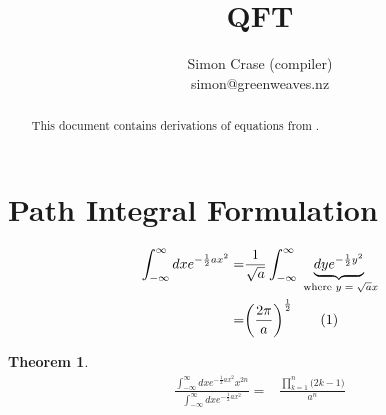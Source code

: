 \documentclass[]{article}
\title{QFT}
\author{Simon Crase (compiler)\\simon@greenweaves.nz}
\newcommand\numberthis{\addtocounter{equation}{1}\tag{\theequation}}
\newtheorem{thm}{Theorem}
\begin{document}
\maketitle

\begin{abstract}

This document contains derivations of equations from \cite{zee2010quantum}.

\end{abstract}

\section{Path Integral Formulation}

\begin{align*}
	\int_{-\infty}^{\infty} dx e^{-\frac{1}{2}ax^2} =& \frac{1}{\sqrt{a}}\int_{-\infty}^{\infty} \underbrace{dy e^{-\frac{1}{2}y^2}}_\text{ where $y=\sqrt{a}x$} \\
	=& \bigg(\frac{2\pi}{a}\bigg)^\frac{1}{2} \numberthis \label{eq:integral:gaussian}
\end{align*}
\begin{thm}
	\begin{align*}
		\frac{\int_{-\infty}^\infty dx e^{-\frac{1}{2}ax^2}x^{2n}}{\int_{-\infty}^\infty dx e^{-\frac{1}{2}ax^2}} =&\frac{\prod_{k=1}^{n}\big(2k-1\big)}{a^n}
	\end{align*}
\end{thm}
\end{document}

